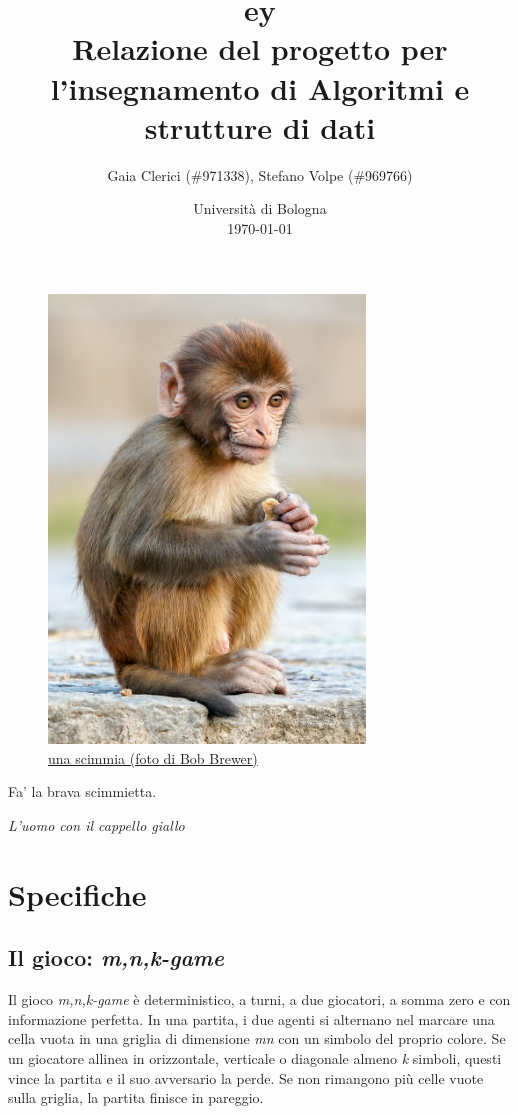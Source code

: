 \documentclass{article}
\title{
  {
    \fontspec[ Path = fonts/ ]{Symbola}
    \symbol{"1F17C}\symbol{"1F435}\symbol{"1F17D}\symbol{"1F17A}ey
  } \large \\
  \small Relazione del progetto per l'insegnamento di Algoritmi e strutture di
  dati
}
\author{
  Gaia Clerici (\#971338),
  Stefano Volpe (\#969766)
}
\date{
	Universit\`a di Bologna \\
  \today
}
\begin{document}
\maketitle
\thispagestyle{empty}

\begin{figure}[h]
  \includegraphics[width=0.75\textwidth]{monkey}
  \centering
  \caption{\href{https://unsplash.com/photos/daC7ji1EMHM}{una scimmia
  (foto di Bob Brewer)}}
\end{figure}

\pagebreak

\epigraph{Fa' la brava scimmietta.}{\textit{L'uomo con il cappello giallo}}

\tableofcontents

\section{Specifiche}

\subsection{Il gioco: \emph{m,n,k-game}}

Il gioco \emph{m,n,k-game} è deterministico, a turni, a due giocatori, a somma
zero e con informazione perfetta. In una partita, i due agenti si alternano nel
marcare una cella vuota in una griglia di dimensione \emph{m}\texttimes \emph{n}
con un simbolo del proprio colore. Se un giocatore allinea in orizzontale,
verticale o diagonale almeno \emph{k} simboli, questi vince la partita e il suo
avversario la perde. Se non rimangono più celle vuote sulla griglia, la partita
finisce in pareggio.
\end{document}
